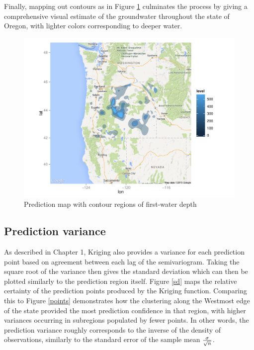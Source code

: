 \documentclass[12pt,twoside]{reedthesis}
\begin{document}
Finally, mapping out contours as in Figure \ref{polygon} culminates the process by giving a comprehensive visual estimate of the groundwater throughout the state of Oregon, with lighter colors corresponding to deeper water.
	
\begin{figure}[h]
	   
	       \centering
	  
	    \includegraphics[scale=0.9]{polygon_plot}
	
	     \caption{Prediction map with contour regions of first-water depth}
	 \label{polygon}
	\end{figure}
	
	   
	  
	
	
\subsection{Prediction variance}

As described in Chapter 1, Kriging also provides a variance for each prediction point based on agreement between each lag of the semivariogram. Taking the square root of the variance then gives the standard deviation which can then be plotted similarly to the prediction region itself. Figure \ref{sd} maps the relative certainty of the prediction points produced by the Kriging function. Comparing this to Figure \ref{points} demonstrates how the clustering along the Westmost edge of the state provided the most prediction confidence in that region, with higher variances occurring in subregions populated by fewer points. In other words, the prediction variance roughly corresponds to the inverse of the density of observations, similarly to the standard error of the sample mean ${\sigma}\over{\sqrt{n}}$.
	
\end{document}

